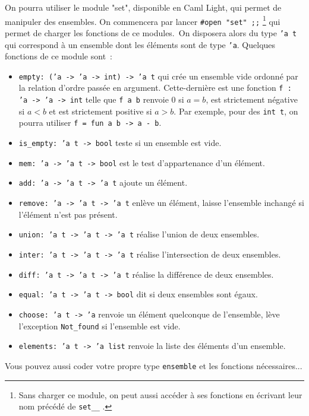 \documentclass[10pt,a4paper]{article}
\begin{document}
On pourra utiliser le module "set", disponible en Caml Light, qui permet de 
manipuler des ensembles. On commencera par lancer 
\texttt{\#open "set" ;;} \footnote{Sans charger ce module, on peut aussi accéder à 
ses fonctions en écrivant leur nom précédé de \texttt{set\_\_} .} qui
permet de charger les fonctions de ce modules. On disposera alors du type 
\texttt{'a t} qui correspond à un ensemble dont les éléments sont de type 
\texttt{'a}. Quelques fonctions de ce module sont~:
\begin{itemize}
\item \texttt{empty: ('a -> 'a -> int) -> 'a t} qui crée un ensemble vide 
ordonné par la relation d'ordre passée en argument. Cette-dernière est une 
fonction \texttt{f : 'a -> 'a -> int} telle que \texttt{f a b} renvoie $0$ si 
$a=b$, est strictement négative si $a<b$ et est strictement positive si $a>b$. 
Par exemple, pour des \texttt{int t}, on pourra utiliser 
\texttt{f = fun a b -> a - b}.
\item \texttt{is\_empty: 'a t -> bool} teste si un ensemble est vide.
\item \texttt{mem: 'a -> 'a t -> bool} est le test d'appartenance d'un élément.
\item \texttt{add: 'a -> 'a t -> 'a t} ajoute un élément.
\item \texttt{remove: 'a -> 'a t -> 'a t} enlève un élément, laisse l'ensemble 
inchangé si l'élément n'est pas présent.
\item \texttt{union: 'a t -> 'a t -> 'a t} réalise l'union de deux ensembles.
\item \texttt{inter: 'a t -> 'a t -> 'a t} réalise l'intersection de deux 
ensembles.
\item \texttt{diff: 'a t -> 'a t -> 'a t} réalise la différence de deux 
ensembles.
\item \texttt{equal: 'a t -> 'a t -> bool} dit si deux ensembles sont égaux.
\item \texttt{choose: 'a t -> 'a} renvoie un élément quelconque de l'ensemble, 
lève l'exception \texttt{Not\_found} si l'ensemble est vide.
\item \texttt{elements: 'a t -> 'a list} renvoie la liste des éléments d'un 
ensemble.
\end{itemize}
Vous pouvez aussi coder votre propre type \texttt{ensemble} et les fonctions 
nécessaires...
\end{document}
